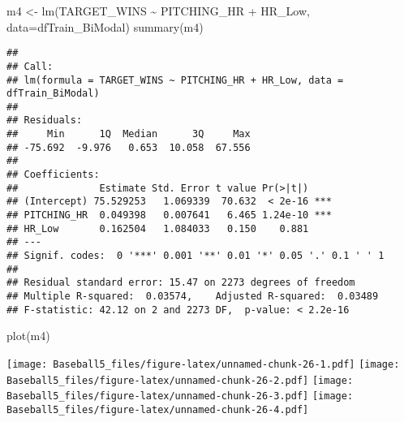 \documentclass[
]{article}
\newenvironment{Shaded}{\begin{snugshade}}{\end{snugshade}}
\newcommand{\AttributeTok}[1]{\textcolor[rgb]{0.77,0.63,0.00}{#1}}
\newcommand{\DecValTok}[1]{\textcolor[rgb]{0.00,0.00,0.81}{#1}}
\newcommand{\FunctionTok}[1]{\textcolor[rgb]{0.00,0.00,0.00}{#1}}
\newcommand{\NormalTok}[1]{#1}
\newcommand{\OtherTok}[1]{\textcolor[rgb]{0.56,0.35,0.01}{#1}}
\newcommand{\SpecialCharTok}[1]{\textcolor[rgb]{0.00,0.00,0.00}{#1}}
\begin{document}
\begin{Shaded}
\begin{Highlighting}[]
\NormalTok{m4 }\OtherTok{\textless{}{-}} \FunctionTok{lm}\NormalTok{(TARGET\_WINS }\SpecialCharTok{\textasciitilde{}}\NormalTok{ PITCHING\_HR }\SpecialCharTok{+}\NormalTok{ HR\_Low, }\AttributeTok{data=}\NormalTok{dfTrain\_BiModal)}
\FunctionTok{summary}\NormalTok{(m4)}
\end{Highlighting}
\end{Shaded}

\begin{verbatim}
## 
## Call:
## lm(formula = TARGET_WINS ~ PITCHING_HR + HR_Low, data = dfTrain_BiModal)
## 
## Residuals:
##     Min      1Q  Median      3Q     Max 
## -75.692  -9.976   0.653  10.058  67.556 
## 
## Coefficients:
##              Estimate Std. Error t value Pr(>|t|)    
## (Intercept) 75.529253   1.069339  70.632  < 2e-16 ***
## PITCHING_HR  0.049398   0.007641   6.465 1.24e-10 ***
## HR_Low       0.162504   1.084033   0.150    0.881    
## ---
## Signif. codes:  0 '***' 0.001 '**' 0.01 '*' 0.05 '.' 0.1 ' ' 1
## 
## Residual standard error: 15.47 on 2273 degrees of freedom
## Multiple R-squared:  0.03574,    Adjusted R-squared:  0.03489 
## F-statistic: 42.12 on 2 and 2273 DF,  p-value: < 2.2e-16
\end{verbatim}

\begin{Shaded}
\begin{Highlighting}[]
\FunctionTok{plot}\NormalTok{(m4)}
\end{Highlighting}
\end{Shaded}

\texttt{[image: Baseball5\_files/figure-latex/unnamed-chunk-26-1.pdf]}
\texttt{[image: Baseball5\_files/figure-latex/unnamed-chunk-26-2.pdf]}
\texttt{[image: Baseball5\_files/figure-latex/unnamed-chunk-26-3.pdf]}
\texttt{[image: Baseball5\_files/figure-latex/unnamed-chunk-26-4.pdf]}

\begin{Shaded}
\end{Shaded}
\end{document}
